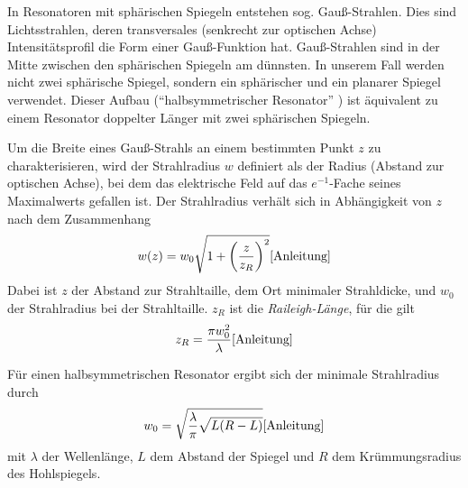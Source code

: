 \documentclass{article}
\begin{document}
In Resonatoren mit sphärischen Spiegeln entstehen sog. Gauß-Strahlen. Dies sind Lichtsstrahlen, deren transversales
(senkrecht zur optischen Achse) Intensitätsprofil die Form einer Gauß-Funktion hat.
Gauß-Strahlen sind in der Mitte zwischen den sphärischen Spiegeln am dünnsten. In unserem Fall werden nicht
zwei sphärische Spiegel, sondern ein sphärischer und ein planarer Spiegel verwendet.
Dieser Aufbau (\enquote{halbsymmetrischer Resonator} \cite{Anleitung}) ist äquivalent
zu einem Resonator doppelter Länger mit zwei sphärischen Spiegeln. 

Um die Breite eines Gauß-Strahls an einem bestimmten Punkt $z$ zu charakterisieren,
wird der Strahlradius $w$ definiert als der Radius (Abstand zur optischen Achse),
bei dem das elektrische Feld auf das $e^{-1}$-Fache seines Maximalwerts gefallen ist.
Der Strahlradius verhält sich in Abhängigkeit von $z$ nach dem Zusammenhang
\begin{equation}
  w(z) = w_0 \sqrt{1+\left( \frac{z}{z_R} \right)^2} \label{eq:strahlradius} \cite{Anleitung}
\end{equation}
Dabei ist $z$ der Abstand zur Strahltaille, dem Ort minimaler Strahldicke, und $w_0$ der Strahlradius bei der Strahltaille.
$z_R$ ist die \textit{Raileigh-Länge}, für die gilt
\begin{equation}
  z_R = \frac{\pi w_0^2}{\lambda} \label{eq:rayleigh-length} \cite{Anleitung}
\end{equation}

Für einen halbsymmetrischen Resonator ergibt sich der minimale Strahlradius durch
\begin{equation}
  w_0 = \sqrt{\frac{\lambda}{\pi} \sqrt{L(R-L)}} \label{eq:waist} \cite{Anleitung}
\end{equation}
mit $\lambda$ der Wellenlänge, $L$ dem Abstand der Spiegel und $R$ dem Krümmungsradius des Hohlspiegels.
\end{document}
